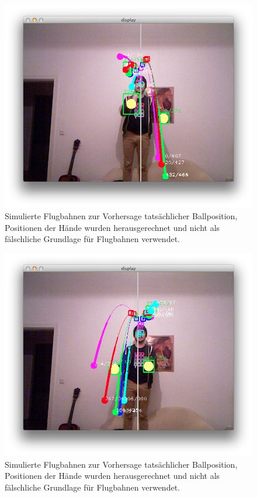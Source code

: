 \documentclass[12pt,a4paper,ngerman]{scrartcl}
\begin{document}
\begin{figure}[H]
    \centering
    \includegraphics[scale=0.5]{img/trajectory-hand-2.png}
    \vspace{-0.5cm}
    \caption{Simulierte Flugbahnen zur Vorhersage tatsächlicher Ballposition, Positionen der Hände wurden herausgerechnet und nicht als fälschliche Grundlage für Flugbahnen verwendet.}
    \label{ballcount-1}
\end{figure}

\begin{figure}[H]
    \centering
    \includegraphics[scale=0.5]{img/trajectory-hand-3.png}
    \vspace{-0.5cm}
    \caption{Simulierte Flugbahnen zur Vorhersage tatsächlicher Ballposition, Positionen der Hände wurden herausgerechnet und nicht als fälschliche Grundlage für Flugbahnen verwendet.}
    \label{ballcount-1}
\end{figure}
\end{document}
